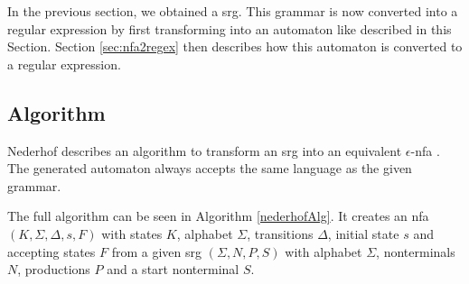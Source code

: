 In the previous section, we obtained a \acl{srg}. This grammar is now converted into a regular expression by first transforming into an automaton like described in this Section. Section \ref{sec:nfa2regex} then describes how this automaton is converted to a regular expression.

\subsection{Algorithm}

Nederhof describes an algorithm to transform an \ac{srg} into an equivalent $\epsilon$-\ac{nfa} \cite{nederhof}. The generated automaton always accepts the same language as the given grammar.

The full algorithm can be seen in Algorithm \ref{nederhofAlg}. It creates an \ac{nfa} $(K,\Sigma, \Delta, s, F)$ with states $K$, alphabet $\Sigma$, transitions $\Delta$, initial state $s$ and accepting states $F$ from a given \ac{srg} $(\Sigma, N, P, S)$ with alphabet $\Sigma$, nonterminals $N$, productions $P$ and a start nonterminal $S$.


